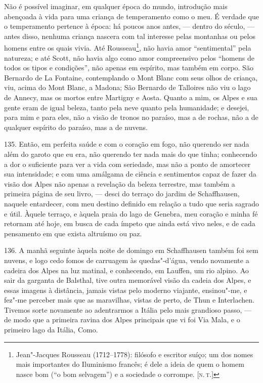 Não é possível imaginar, em qualquer época do mundo, introdução mais
abençoada à vida para uma criança de temperamento como o meu. É verdade
que o temperamento pertence à época: há poucos anos antes, --- dentro do
século, --- antes disso, nenhuma criança nascera com tal interesse pelas
montanhas ou pelos homens entre os quais vivia. Até Rousseau\footnote{Jean"-Jacques
  Rousseau (1712--1778): filósofo e escritor suíço; um dos nomes mais
  importantes do Iluminismo francês; é dele a ideia de quem o homem
  nasce bom (``o bom selvagem'') e a sociedade o corrompe. {[}\textsc{n.\,t.}{]}}, não havia amor ``sentimental'' pela natureza; e até Scott,
não havia algo como amor compreensivo pelos ``homens de todos os tipos e
condições'', não apenas em espírito, mas também em corpo. São Bernardo
de La Fontaine, contemplando o Mont Blanc com seus olhos de criança,
viu, acima do Mont Blanc, a Madona; São Bernardo de Talloires não viu o
lago de Annecy, mas os mortos entre Martigny e Aosta. Quanto a mim, os
Alpes e sua gente eram de igual beleza, tanto pela neve quanto pela
humanidade; e desejei, para mim e para eles, não a visão de tronos no
paraíso, mas a de rochas, não a de qualquer espírito do paraíso, mas a
de nuvens.

135. Então, em perfeita saúde e com o coração em fogo, não querendo ser
nada além do garoto que eu era, não querendo ter nada mais do que tinha;
conhecendo a dor o suficiente para ver a vida com seriedade, mas não a
ponto de amortecer sua intensidade; e com uma amálgama de ciência e
sentimentos capaz de fazer da visão dos Alpes não apenas a revelação da
beleza terrestre, mas também a primeira página de seu livro, --- desci do
terraço do jardim de Schaffhausen, naquele entardecer, com meu destino
definido em relação a tudo que seria sagrado e útil. Àquele terraço, e
àquela praia do lago de Genebra, meu coração e minha fé retornam até
hoje, em busca de cada ímpeto que ainda está vivo neles, e de cada
pensamento em que exista altruísmo ou paz.

136. A manhã seguinte àquela noite de domingo em Schaffhausen também foi
sem nuvens, e logo cedo fomos de carruagem às quedas"-d'água, vendo
novamente a cadeira dos Alpes na luz matinal, e conhecendo, em Lauffen,
um rio alpino. Ao sair da garganta de Balsthal, tive outra memorável
visão da cadeia dos Alpes, e essas imagens à distância, jamais vistas
pelo moderno viajante, ensinou"-me, e fez"-me perceber mais que as
maravilhas, vistas de perto, de Thun e Interlachen. Tivemos sorte
novamente ao adentrarmos a Itália pelo mais grandioso passo, --- de modo
que a primeira ravina dos Alpes principais que vi foi Via Mala, e o
primeiro lago da Itália, Como.

